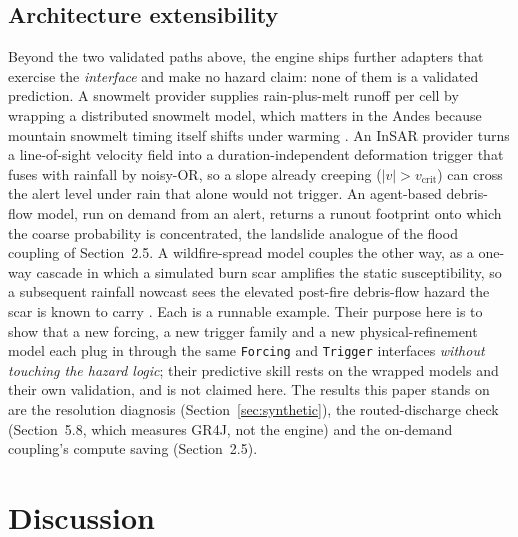 \documentclass[authoryear,preprint,review,12pt]{elsarticle}
\begin{document}
\subsection{Architecture extensibility}

Beyond the two validated paths above, the engine ships further adapters that
exercise the \emph{interface} and make no hazard claim: none of them is a validated prediction. A snowmelt provider supplies rain-plus-melt runoff per cell by wrapping a distributed snowmelt model, which matters in the Andes because mountain snowmelt timing itself shifts under warming \citep{musselman2017}. An InSAR provider turns a
line-of-sight velocity field into a duration-independent deformation trigger that
fuses with rainfall by noisy-OR, so a slope already creeping
($|v|>v_{\mathrm{crit}}$) can cross the alert level under rain that alone would not trigger. An agent-based debris-flow model, run on demand from an alert, returns
a runout footprint onto which the coarse probability is concentrated, the landslide analogue of the flood coupling of Section~2.5. A wildfire-spread model couples the other way, as a one-way cascade in which a simulated burn scar amplifies the
static susceptibility, so a subsequent rainfall nowcast sees the elevated post-fire
debris-flow hazard the scar is known to carry \citep{cannon2008}. Each is a runnable example. Their
purpose here is to show that a new forcing, a new trigger family and a new
physical-refinement model each plug in through the same \texttt{Forcing} and
\texttt{Trigger} interfaces \emph{without touching the hazard logic}; their
predictive skill rests on the wrapped models and their own validation, and is not
claimed here. The results this paper stands on are the resolution diagnosis
(Section~\ref{sec:synthetic}), the routed-discharge check (Section~5.8, which measures GR4J, not the engine) and the on-demand
coupling's compute saving (Section~2.5).

\section{Discussion}
\end{document}
